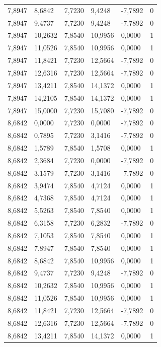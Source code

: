 \documentclass[12pt]{article}
\begin{document}
\begin{longtable}{@{}llllll@{}}
		7,8947  & 8,6842  & 7,7230  & 9,4248  & -7,7892  & 0  \\
		7,8947  & 9,4737  & 7,7230  & 9,4248  & -7,7892  & 0  \\
		7,8947  & 10,2632 & 7,8540  & 10,9956 & 0,0000   & 1  \\
		7,8947  & 11,0526 & 7,8540  & 10,9956 & 0,0000   & 1  \\
		7,8947  & 11,8421 & 7,7230  & 12,5664 & -7,7892  & 0  \\
		7,8947  & 12,6316 & 7,7230  & 12,5664 & -7,7892  & 0  \\
		7,8947  & 13,4211 & 7,8540  & 14,1372 & 0,0000   & 1  \\
		7,8947  & 14,2105 & 7,8540  & 14,1372 & 0,0000   & 1  \\
		7,8947  & 15,0000 & 7,7230  & 15,7080 & -7,7892  & 0  \\
		8,6842  & 0,0000  & 7,7230  & 0,0000  & -7,7892  & 0  \\
		8,6842  & 0,7895  & 7,7230  & 3,1416  & -7,7892  & 0  \\
		8,6842  & 1,5789  & 7,8540  & 1,5708  & 0,0000   & 1  \\
		8,6842  & 2,3684  & 7,7230  & 0,0000  & -7,7892  & 0  \\
		8,6842  & 3,1579  & 7,7230  & 3,1416  & -7,7892  & 0  \\
		8,6842  & 3,9474  & 7,8540  & 4,7124  & 0,0000   & 1  \\
		8,6842  & 4,7368  & 7,8540  & 4,7124  & 0,0000   & 1  \\
		8,6842  & 5,5263  & 7,8540  & 7,8540  & 0,0000   & 1  \\
		8,6842  & 6,3158  & 7,7230  & 6,2832  & -7,7892  & 0  \\
		8,6842  & 7,1053  & 7,8540  & 7,8540  & 0,0000   & 1  \\
		8,6842  & 7,8947  & 7,8540  & 7,8540  & 0,0000   & 1  \\
		8,6842  & 8,6842  & 7,8540  & 10,9956 & 0,0000   & 1  \\
		8,6842  & 9,4737  & 7,7230  & 9,4248  & -7,7892  & 0  \\
		8,6842  & 10,2632 & 7,8540  & 10,9956 & 0,0000   & 1  \\
		8,6842  & 11,0526 & 7,8540  & 10,9956 & 0,0000   & 1  \\
		8,6842  & 11,8421 & 7,7230  & 12,5664 & -7,7892  & 0  \\
		8,6842  & 12,6316 & 7,7230  & 12,5664 & -7,7892  & 0  \\
		8,6842  & 13,4211 & 7,8540  & 14,1372 & 0,0000   & 1  \\

\end{longtable}
\end{document}
